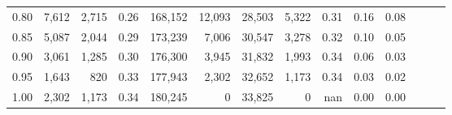 \begin{tabular}{rrrrrrrrrrrrrr}
0.80 &   7,612 &  2,715 &  0.26 &  168,152 &   12,093 &  28,503 &   5,322 &  0.31 &  0.16 &      0.08 \\
0.85 &   5,087 &  2,044 &  0.29 &  173,239 &    7,006 &  30,547 &   3,278 &  0.32 &  0.10 &      0.05 \\
0.90 &   3,061 &  1,285 &  0.30 &  176,300 &    3,945 &  31,832 &   1,993 &  0.34 &  0.06 &      0.03 \\
0.95 &   1,643 &    820 &  0.33 &  177,943 &    2,302 &  32,652 &   1,173 &  0.34 &  0.03 &      0.02 \\
1.00 &   2,302 &  1,173 &  0.34 &  180,245 &        0 &  33,825 &       0 &   nan &  0.00 &      0.00 \\
\bottomrule
\end{tabular}
